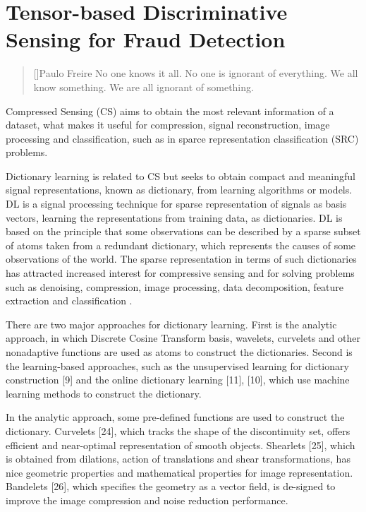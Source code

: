 \chapter{Tensor-based Discriminative Sensing for Fraud Detection}
\label{ch:4_tensor_dl}

\begin{quotation}[]{Paulo Freire}
No one knows it all. No one is ignorant of everything. We all know something. We are all ignorant of something.
\end{quotation}


Compressed Sensing (CS) aims to obtain the most relevant information of a dataset, what makes it useful for compression, signal reconstruction, image processing and classification, such as in sparce representation classification (SRC) problems. 

Dictionary learning is related to CS but seeks to obtain compact and meaningful signal representations, known as dictionary, from learning algorithms or models. DL is a signal processing technique for sparse representation of signals as basis vectors, learning the representations from training data, as dictionaries. DL is based on the principle that some observations can be described by a sparse subset of atoms taken from a redundant dictionary, which represents the causes of some observations of the world. The sparse representation in terms of such dictionaries has attracted increased interest for compressive sensing and for solving problems such as denoising, compression, image processing, data decomposition, feature extraction and classification \cite{tosic2011dictionary, zhang2010discriminative, zhu2016coupled,ravishankar2011mr}. 

There are two major approaches for dictionary learning. First is the analytic approach, in which Discrete Cosine Transform basis, wavelets, curvelets and other nonadaptive functions are used as atoms to construct the dictionaries. Second is the learning-based approaches, such as the unsupervised learning for dictionary construction [9] and the online dictionary learning [11], [10], which use machine learning methods to construct the dictionary. 

In the analytic approach, some pre-defined functions are used to construct the dictionary. Curvelets [24], which tracks the shape of the discontinuity set, offers efficient and near-optimal representation of smooth objects. Shearlets [25], which is obtained from dilations, action of translations and shear transformations, has nice geometric properties and mathematical properties for image representation. Bandelets [26], which specifies the geometry as a vector field, is de-signed to improve the image compression and noise reduction performance. 

